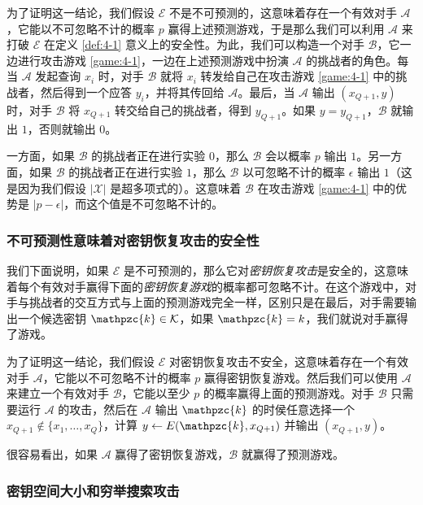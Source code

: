 为了证明这一结论，我们假设 $\mathcal{E}$ 不是不可预测的，这意味着存在一个有效对手 $\mathcal{A}$，它能以不可忽略不计的概率 $p$ 赢得上述预测游戏，于是那么我们可以利用 $\mathcal{A}$ 来打破 $\mathcal{E}$ 在定义 \ref{def:4-1} 意义上的安全性。为此，我们可以构造一个对手 $\mathcal{B}$，它一边进行攻击游戏 \ref{game:4-1}，一边在上述预测游戏中扮演 $\mathcal{A}$ 的挑战者的角色。每当 $\mathcal{A}$ 发起查询 $x_i$ 时，对手 $\mathcal{B}$ 就将 $x_i$ 转发给自己在攻击游戏 \ref{game:4-1} 中的挑战者，然后得到一个应答 $y_i$，并将其传回给 $\mathcal{A}$。最后，当 $\mathcal{A}$ 输出 $(x_{Q+1},y)$ 时，对手 $\mathcal{B}$ 将 $x_{Q+1}$ 转交给自己的挑战者，得到 $y_{Q+1}$。如果 $y=y_{Q+1}$，$\mathcal{B}$ 就输出 $1$，否则就输出 $0$。

一方面，如果 $\mathcal{B}$ 的挑战者正在进行实验 $0$，那么 $\mathcal{B}$ 会以概率 $p$ 输出 $1$。另一方面，如果 $\mathcal{B}$ 的挑战者正在进行实验 $1$，那么 $\mathcal{B}$ 以可忽略不计的概率 $\epsilon$ 输出 $1$（这是因为我们假设 $|\mathcal{X}|$ 是超多项式的）。这意味着 $\mathcal{B}$ 在攻击游戏 \ref{game:4-1} 中的优势是 $|p-\epsilon|$，而这个值是不可忽略不计的。

\subsubsection{不可预测性意味着对密钥恢复攻击的安全性}\label{subsubsec:4-1-1-2}

我们下面说明，如果 $\mathcal{E}$ 是不可预测的，那么它对\emph{密钥恢复攻击}是安全的，这意味着每个有效对手赢得下面的\emph{密钥恢复游戏}的概率都可忽略不计。在这个游戏中，对手与挑战者的交互方式与上面的预测游戏完全一样，区别只是在最后，对手需要输出一个候选密钥 $\mathpzc{k}\in\mathcal{K}$，如果 $\mathpzc{k}=k$，我们就说对手赢得了游戏。

为了证明这一结论，我们假设 $\mathcal{E}$ 对密钥恢复攻击不安全，这意味着存在一个有效对手 $\mathcal{A}$，它能以不可忽略不计的概率 $p$ 赢得密钥恢复游戏。然后我们可以使用 $\mathcal{A}$ 来建立一个有效对手 $\mathcal{B}$，它能以至少 $p$ 的概率赢得上面的预测游戏。对手 $\mathcal{B}$ 只需要运行 $\mathcal{A}$ 的攻击，然后在 $\mathcal{A}$ 输出 $\mathpzc{k}$ 的时侯任意选择一个 $x_{Q+1}\notin\{x_1,\dots,x_Q\}$，计算 $y\leftarrow E(\mathpzc{k},x_{Q+1})$ 并输出 $(x_{Q+1},y)$。

很容易看出，如果 $\mathcal{A}$ 赢得了密钥恢复游戏，$\mathcal{B}$ 就赢得了预测游戏。

\subsubsection{密钥空间大小和穷举搜索攻击}

